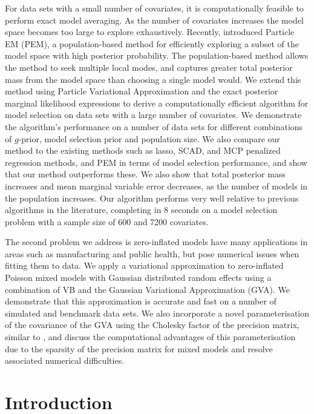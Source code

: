 For data sets with a small number of covariates, it is computationally feasible
to perform exact model averaging. As the number of covariates increases the
model space becomes too large to explore exhaustively.  Recently,
\cite{Rockova2017} introduced Particle EM (PEM), a population-based method for
efficiently exploring a subset of the model space with high posterior
probability. The population-based method allows the method to seek multiple
local modes, and captures greater total posterior mass from the model space
than choosing a single model would. We extend this method using Particle
Variational Approximation and the exact posterior marginal likelihood
expressions to derive a computationally efficient algorithm for model selection
on data sets with a large number of covariates. We demonstrate the algorithm's
performance on a number of data sets for different combinations of $g$-prior,
model selection prior and population size. We also compare our method to the
existing methods such as lasso, SCAD, and MCP penalized regression methods, and
PEM in terms of model selection performance,  and show that our method
outperforms these. We also show that total posterior mass increases and mean
marginal variable error decreases, as the number of models in the population
increases.
Our algorithm performs very well relative to previous algorithms in the
literature, completing in 8 seconds on a model selection problem with a sample
size of 600 and 7200 covariates.

The second problem we address is zero-inflated models have many applications in
areas such as manufacturing and public health, but pose numerical issues when
fitting them to data. We apply a variational approximation to zero-inflated
Poisson mixed models with Gaussian distributed random effects using a
combination of VB and the Gaussian Variational Approximation (GVA). We
demonstrate that this approximation is accurate and fast on a number of
simulated and benchmark data sets. We also incorporate a novel parameterisation
of the covariance of the GVA using the Cholesky factor of the precision matrix,
similar to \cite{Tan2018}, and discuss the computational advantages of this
parameterisation due to the sparsity of the precision matrix for mixed models
and resolve associated numerical difficulties.


\chapter{Introduction}

